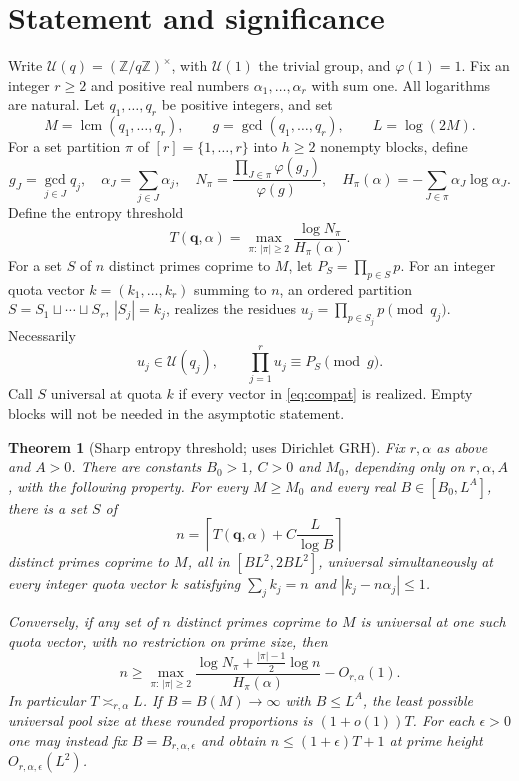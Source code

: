 \documentclass[11pt]{article}
\newtheorem{theorem}{Theorem}[section]
\theoremstyle{definition}\newtheorem{remark}[theorem]{Remark}
\newcommand{\G}{\mathcal U}
\newcommand{\lcm}{\operatorname{lcm}}
\begin{document}
\section{Statement and significance}\label{sec:statement}
Write $\G(q)=(\mathbb Z/q\mathbb Z)^\times$, with $\G(1)$ the trivial group, and $\varphi(1)=1$. Fix an integer $r\ge2$ and positive real numbers $\alpha_1,\dots,\alpha_r$ with sum one. All logarithms are natural. Let $q_1,\dots,q_r$ be positive integers, and set
\[
 M=\lcm(q_1,\dots,q_r),\qquad g=\gcd(q_1,\dots,q_r),\qquad L=\log(2M).
\]
For a set partition $\pi$ of $[r]=\{1,\dots,r\}$ into $h\ge2$ nonempty blocks, define
\begin{equation}\label{eq:def}
 g_J=\gcd_{j\in J}q_j,\quad \alpha_J=\sum_{j\in J}\alpha_j,\quad
 N_\pi=\frac{\prod_{J\in\pi}\varphi(g_J)}{\varphi(g)},\quad
 H_\pi(\alpha)=-\sum_{J\in\pi}\alpha_J\log\alpha_J .
\end{equation}
Define the entropy threshold
\begin{equation}\label{eq:threshold}
 T(\mathbf q,\alpha)=\max_{\pi:\,|\pi|\ge2}\frac{\log N_\pi}{H_\pi(\alpha)}.
\end{equation}
For a set $S$ of $n$ distinct primes coprime to $M$, let $P_S=\prod_{p\in S}p$. For an integer quota vector $k=(k_1,\dots,k_r)$ summing to $n$, an ordered partition $S=S_1\sqcup\cdots\sqcup S_r$, $|S_j|=k_j$, realizes the residues $u_j=\prod_{p\in S_j}p\pmod{q_j}$. Necessarily
\begin{equation}\label{eq:compat}
 u_j\in\G(q_j),\qquad \prod_{j=1}^r u_j\equiv P_S\pmod g .
\end{equation}
Call $S$ universal at quota $k$ if every vector in \eqref{eq:compat} is realized. Empty blocks will not be needed in the asymptotic statement.

\begin{theorem}[Sharp entropy threshold; uses Dirichlet GRH]\label{thm:main}
Fix $r,\alpha$ as above and $A>0$. There are constants $B_0>1$, $C>0$ and $M_0$, depending only on $r,\alpha,A$, with the following property. For every $M\ge M_0$ and every real $B\in[B_0,L^A]$, there is a set $S$ of
\begin{equation}\label{eq:n}
 n=\left\lceil T(\mathbf q,\alpha)+C\frac{L}{\log B}\right\rceil
\end{equation}
distinct primes coprime to $M$, all in $[B L^2,2B L^2]$, universal simultaneously at every integer quota vector $k$ satisfying $\sum_j k_j=n$ and $|k_j-n\alpha_j|\le1$.

Conversely, if any set of $n$ distinct primes coprime to $M$ is universal at one such quota vector, with no restriction on prime size, then
\begin{equation}\label{eq:lower}
 n\ge \max_{\pi:\,|\pi|\ge2}\frac{\log N_\pi+\tfrac{|\pi|-1}{2}\log n}{H_\pi(\alpha)}-O_{r,\alpha}(1).
\end{equation}
In particular $T\asymp_{r,\alpha} L$. If $B=B(M)\to\infty$ with $B\le L^A$, the least possible universal pool size at these rounded proportions is $(1+o(1))T$. For each $\epsilon>0$ one may instead fix $B=B_{r,\alpha,\epsilon}$ and obtain $n\le(1+\epsilon)T+1$ at prime height $O_{r,\alpha,\epsilon}(L^2)$.
\end{theorem}
\end{document}
